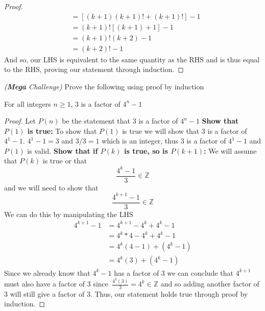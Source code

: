 \documentclass[addpoints]{exam}
\begin{document}
\begin{questions}
\begin{solution}[\stretch{1}]
\begin{proof}
\begin{align*}
          &= \left[\left(k+1\right)\left(k+1\right)\textbf{!} + \left(k+1\right)\textbf{!}\right] - 1 \tag{by the associative property of addition} \\ 
          &= \left(k+1\right)\textbf{!}\left[\left(k+1\right) + 1\right] - 1 \tag{by factoring}\\ 
          &= \left(k+1\right)\textbf{!}\left(k+2\right) - 1 \\ 
          &= \left(k+2\right)\textbf{!} - 1 \tag{by properties of factorials}
        \end{align*}
        And so, our LHS is equivalent to the same quantity as the RHS and is thus equal to the RHS, proving our statement through induction.
      \end{proof}
    \end{solution}
    \newpage 
    \question \textit{(\textbf{Mega} Challenge)} Prove the following using proof by induction
    \begin{center}
      For all integers $n \geq 1$, $3$ is a factor of $4^n - 1$
    \end{center}
    \begin{solution}[\stretch{1}]
      \begin{proof}
        Let $P(n)$ be the statement that $3$ is a factor of $4^n - 1$ 
        \newline\textbf{Show that $P(1)$ is true:} To show that $P(1)$ is true we will show that $3$ is a factor of $4^1 - 1$. $4^1 - 1 = 3$ and $3/3 = 1$ which is an integer, thus $3$ is a factor of $4^1-1$ and $P(1)$ is valid. 
        \newline\textbf{Show that if $P(k)$ is true, so is $P(k+1)$:} We will assume that $P(k)$ is true or that 
        \[
        \frac{4^k-1}{3} \in \mathbb{Z}
        \]
        and we will need to show that 
        \[
        \frac{4^{k+1}-1}{3} \in \mathbb{Z}
        \]
        We can do this by manipulating the LHS
        \begin{align*}
          4^{k+1} - 1 &= 4^{k+1} - 4^k + 4^k - 1 \\ 
          &= 4^k * 4 - 4^k + 4^k - 1 \\ 
          &= 4^k(4-1) + (4^k - 1) \\ 
          &= 4^k(3) + (4^k - 1)
        \end{align*}
        Since we already know that $4^k-1$ has a factor of $3$ we can conclude that $4^{k+1}$ must also have a factor of $3$ since $\displaystyle\, \frac{4^k(3)}{3} = 4^k \in \mathbb{Z}$ and so adding another factor of $3$ will still give a factor of $3$. Thus, our statement holds true through proof by induction.
      \end{proof}
    \end{solution}
  \end{questions}
\end{document}
